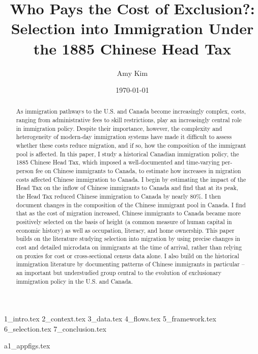 \documentclass[12pt]{article}
\title{Who Pays the Cost of Exclusion?: Selection into Immigration Under the 1885 Chinese Head Tax}
\author{Amy Kim}
\date{\today}
\begin{document}
\maketitle

\begin{abstract} \footnotesize
    As immigration pathways to the U.S. and Canada become increasingly complex, costs, ranging from administrative fees to skill restrictions, play an increasingly central role in immigration policy. Despite their importance, however, the complexity and heterogeneity of modern-day immigration systems have made it difficult to assess whether these costs reduce migration, and if so, how the composition of the immigrant pool is affected. 
    In this paper, I study a historical Canadian immigration policy, the 1885 Chinese Head Tax, which imposed a well-documented and time-varying per-person fee on Chinese immigrants to Canada, to estimate how increases in migration costs affected Chinese immigration to Canada.
    I begin by estimating the impact of the Head Tax on the inflow of Chinese immigrants to Canada and find that at its peak, the Head Tax reduced Chinese immigration to Canada by nearly 80\%. I then document changes in the composition of the Chinese immigrant pool in Canada. I find that as the cost of migration increased, Chinese immigrants to Canada became more positively selected on the basis of height (a common measure of human capital in economic history) as well as occupation, literacy, and home ownership. 
    This paper builds on the literature studying selection into migration by using precise changes in cost and detailed microdata on immigrants at the time of arrival, rather than relying on proxies for cost or cross-sectional census data alone. I also build on the historical immigration literature by documenting patterns of Chinese immigrants in particular -- an important but understudied group central to the evolution of exclusionary immigration policy in the U.S. and Canada.
\end{abstract}

{1_intro.tex}
{2_context.tex}
{3_data.tex}
{4_flows.tex}
{5_framework.tex}
{6_selection.tex}
{7_conclusion.tex}

\newpage


\newpage
\appendix 
{a1_appfigs.tex}
\end{document}
